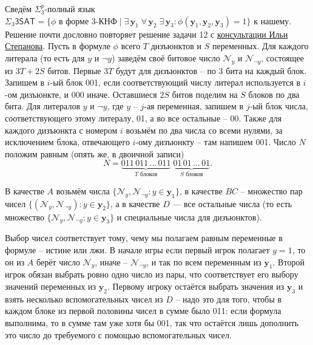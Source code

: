 Сведём $\Sigma_3^p$-полный язык $\Sigma_3\textsf{3SAT} = \{\phi\text{ в форме 3-КНФ}\mid \exists\,\mathbf{y}_1\;\forall\, \mathbf{y}_2\;\exists\,\mathbf{y}_3\colon \phi(\mathbf{y}_1, \mathbf{y}_2, \mathbf{y}_3)=1\}$ к нашему. Решение почти дословно повторяет решение задачи 12 с \href{https://youtu.be/dN753JpeSDs?t=3645}{консультации Ильи Степанова}. Пусть в формуле $\phi$ всего $T$ дизъюнктов и $S$ переменных. Для каждого литерала (то есть для $y$ и $\neg y$) заведём своё битовое число $\mathcal{N}_y$ и $\mathcal{N}_{\neg y}$, состоящее из $3T+2S$ битов. Первые $3T$ будут для дизъюнктов -- по 3 бита на каждый блок. Запишем в $i$-ый блок 001, если соответствующий числу литерал используется в $i$-ом дизъюнкте, и 000 иначе. Оставшиеся $2S$ битов поделим на $S$ блоков по два бита. Для литералов $y$ и $\neg y$, где $y$ -- $j$-ая переменная, запишем в $j$-ый блок числа, соответствующего этому литералу, 01, а во все остальные -- 00. Также для каждого дизъюнкта с номером $i$ возьмём по два числа со всеми нулями, за исключением блока, отвечающего $i$-ому дизъюнкту -- там напишем 001. Число $N$ положим равным (опять же, в двоичной записи)
\[
N = \underbrace{011\,011\,\ldots\,011}_{\text{$T$ блоков}}\;\underbrace{01\,01\,\ldots\,01}_{\text{$S$ блоков}}.
\]

В качестве $A$ возьмём числа  $\{\mathcal{N}_{y}, \mathcal{N}_{\neg y}\colon y \in \mathbf{y}_1\}$, в качестве $BC$ -- множество пар чисел $\{(\mathcal{N}_{y}, \mathcal{N}_{\neg y})\colon y \in \mathbf{y}_2\}$, а в качестве $D$ --- все остальные числа (то есть множество $\{\mathcal{N}_{y}, \mathcal{N}_{\neg y}\colon y \in \mathbf{y}_3\}$ и специальные числа для дизъюнктов).

Выбор чисел соответствует тому, чему мы полагаем равным переменные в формуле -- истине или лжи. В начале игры если первый игрок полагает $y = 1$, то он из $A$ берёт число $\mathcal{N}_y$, иначе -- $\mathcal{N}_{\neg y}$, и так по всем переменным из $\mathbf{y}_1$. Второй игрок обязан выбрать ровно одно число из пары, что соответствует его выбору значений переменных из $\mathbf{y}_2$. Первому игроку остаётся выбрать значения из $\mathbf{y}_3$ и взять несколько вспомогательных чисел из $D$ -- надо это для того, чтобы в каждом блоке из первой половины чисел в сумме было 011: если формула выполнима, то в сумме там уже хотя бы 001, так что остаётся лишь дополнить это число до требуемого с помощью вспомогательных чисел.


